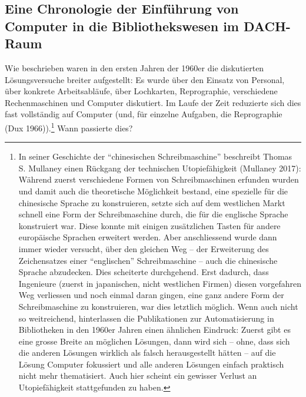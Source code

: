 \documentclass[a4paper,
fontsize=11pt,
oneside,
numbers=noperiodatend,
parskip=half-,
bibliography=totoc,
final
]{scrartcl}
\begin{document}
\hypertarget{eine-chronologie-der-einfuxfchrung-von-computer-in-die-bibliothekswesen-im-dach-raum}{%
\subsection{\texorpdfstring{Eine Chronologie der Einführung \textbf{von}
Computer in die Bibliothekswesen im
DACH-Raum}{Eine Chronologie der Einführung von Computer in die Bibliothekswesen im DACH-Raum}}\label{eine-chronologie-der-einfuxfchrung-von-computer-in-die-bibliothekswesen-im-dach-raum}}

Wie beschrieben waren in den ersten Jahren der 1960er die diskutierten
Lösungsversuche breiter aufgestellt: Es wurde über den Einsatz von
Personal, über konkrete Arbeitsabläufe, über Lochkarten, Reprographie,
verschiedene Rechenmaschinen und Computer diskutiert. Im Laufe der Zeit
reduzierte sich dies fast vollständig auf Computer (und, für einzelne
Aufgaben, die Reprographie (Dux 1966)).\footnote{In seiner Geschichte
  der \enquote{chinesischen Schreibmaschine} beschreibt Thomas S. Mullaney einen
  Rückgang der technischen Utopiefähigkeit (Mullaney 2017): Während
  zuerst verschiedene Formen von Schreibmaschinen erfunden wurden und
  damit auch die theoretische Möglichkeit bestand, eine spezielle für
  die chinesische Sprache zu konstruieren, setzte sich auf dem
  westlichen Markt schnell eine Form der Schreibmaschine durch, die für
  die englische Sprache konstruiert war. Diese konnte mit einigen
  zusätzlichen Tasten für andere europäische Sprachen erweitert werden.
  Aber anschliessend wurde dann immer wieder versucht, über den gleichen
  Weg -- der Erweiterung des Zeichensatzes einer \enquote{englischen}
  Schreibmaschine -- auch die chinesische Sprache abzudecken. Dies
  scheiterte durchgehend. Erst dadurch, dass Ingenieure (zuerst in
  japanischen, nicht westlichen Firmen) diesen vorgefahren Weg
  verliessen und noch einmal daran gingen, eine ganz andere Form der
  Schreibmaschine zu konstruieren, war dies letztlich möglich. Wenn auch
  nicht so weitreichend, hinterlassen die Publikationen zur
  Automatisierung in Bibliotheken in den 1960er Jahren einen ähnlichen
  Eindruck: Zuerst gibt es eine grosse Breite an möglichen Lösungen,
  dann wird sich -- ohne, dass sich die anderen Lösungen wirklich als
  falsch herausgestellt hätten -- auf die Lösung Computer fokussiert und
  alle anderen Lösungen einfach praktisch nicht mehr thematisiert. Auch
  hier scheint ein gewisser Verlust an Utopiefähigkeit stattgefunden zu
  haben.} Wann passierte dies?
\end{document}
